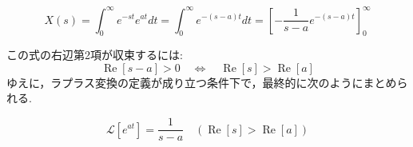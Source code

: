\documentclass[a4paper,12pt]{article}
\begin{document}
\begin{tcolorbox}[title={[1] 指数関数 \(x(t) =e^{at}\) をラプラス変換せよ．}]

\vspace{2mm}

\[
X(s) =\int_0^{\infty} e^{-st} e^{at} dt =
\int_0^{\infty} e^{-(s-a)t} dt =
\left[ - \frac{1}{s-a} e^{-(s-a)t}\right]_0^{\infty} 
\]

\vspace{2mm}

\quad この式の右辺第2項が収束するには:
\[
\operatorname{Re}[s-a] > 0 \quad \Leftrightarrow \quad \operatorname{Re}[s] >
\operatorname{Re}[a]
\]
\quad ゆえに，ラプラス変換の定義が成り立つ条件下で，最終的に次のようにまとめられる.

\vspace{1mm}

\[
\boxed{{\mathcal{L}[e^{at}]=\frac{1}{s-a}} \quad (\operatorname{Re}[s] >\operatorname{Re}[a])}
\]

\vspace{2mm}

\end{tcolorbox}
\end{document}
